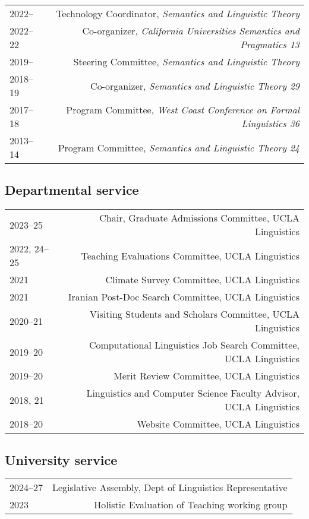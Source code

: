 \documentclass[12pt]{article}
\begin{document}
\begin{longtable}{LR}
  2022--     & Technology Coordinator, \textit{Semantics and Linguistic Theory}\\
  2022--22   & Co-organizer, \textit{California Universities Semantics and
               Pragmatics 13}\\
  2019--     & Steering Committee, \textit{Semantics and Linguistic Theory}\\
  2018--19   & Co-organizer, \textit{Semantics and Linguistic Theory 29}\\
  2017--18   & Program Committee, \textit{West Coast Conference on Formal
               Linguistics 36}\\
  2013--14   & Program Committee, \textit{Semantics and Linguistic Theory 24}
\end{longtable}

\subsection*{Departmental service}

\begin{longtable}{LR}
  2023--25   & Chair, Graduate Admissions Committee, UCLA Linguistics\\
  2022, 24--25
             & Teaching Evaluations Committee, UCLA Linguistics\\
  2021       & Climate Survey Committee, UCLA Linguistics\\
  2021       & Iranian Post-Doc Search Committee, UCLA Linguistics\\
  2020--21   & Visiting Students and Scholars Committee, UCLA Linguistics\\
  2019--20   & Computational Linguistics Job Search Committee, UCLA Linguistics\\
  2019--20   & Merit Review Committee, UCLA Linguistics\\
  2018, 21%
             & Linguistics and Computer Science Faculty Advisor, UCLA Linguistics\\
  2018--20   & Website Committee, UCLA Linguistics
\end{longtable}

\subsection*{University service}

\begin{longtable}{LR}
  2024--27   & Legislative Assembly, Dept of Linguistics Representative\\
  2023       & Holistic Evaluation of Teaching working group
\end{longtable}
\end{document}
